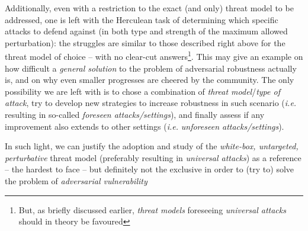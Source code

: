 Additionally, even with a restriction to the exact (and only) threat model to be addressed, one is left with the Herculean task of determining which specific attacks to defend against (in both type and strength of the maximum allowed perturbation): the struggles are similar to those described right above for the threat model of choice -- with no clear-cut answers\footnote{But, as briefly discussed earlier, \textit{threat models} foreseeing \textit{universal attacks} should in theory be favoured}. This may give an example on how difficult a \textit{general solution} to the problem of adversarial robustness actually is, and on why even smaller progresses are cheered by the community.  The only possibility we are left with is to chose a combination of \textit{threat model}/\textit{type of attack}, try to develop new strategies to increase robustness in such scenario (\textit{i.e.} resulting in so-called \textit{foreseen attacks/settings}), and finally assess if any improvement also extends to other settings (\textit{i.e.} \textit{unforeseen attacks/settings}).

In such light, we can justify the adoption and study of the \textit{white-box, untargeted, perturbative} threat model (preferably resulting in \textit{universal attacks}) as a reference -- the hardest to face -- but definitely not the exclusive in order to (try to) solve the problem of \textit{adversarial vulnerability}









